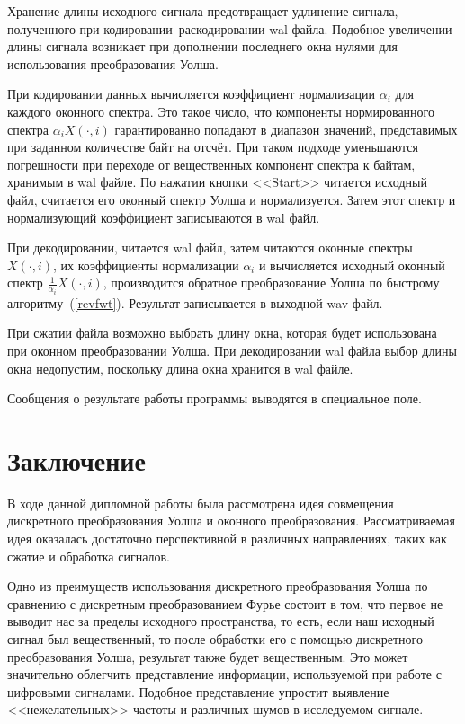 \documentclass{matmex-diploma-custom}
\begin{document}
Хранение длины исходного сигнала предотвращает удлинение сигнала, 
полученного при кодировании--раскодировании wal файла. Подобное увеличении длины
сигнала
возникает при дополнении последнего окна нулями для использования
преобразования Уолша.

При кодировании данных вычисляется коэффициент нормализации $\alpha_i$
для каждого оконного спектра. Это такое число, что компоненты нормированного 
спектра 
$\alpha_i X(\cdot,i)$ гарантированно попадают в диапазон значений, представимых
при заданном количестве байт на отсчёт. При таком подходе уменьшаются 
погрешности при переходе от вещественных компонент спектра к 
байтам, хранимым в wal файле. По нажатии кнопки <<Start>>
читается исходный файл, считается его оконный спектр Уолша и нормализуется. 
Затем этот спектр и нормализующий коэффициент 
записываются в wal файл.
  
При декодировании, читается wal файл, затем читаются оконные спектры
$X(\cdot,i)$,
их коэффициенты нормализации $\alpha_i$ и вычисляется исходный оконный спектр
$\frac{1}{\alpha_i} X(\cdot,i)$, производится обратное 
преобразование Уолша
по быстрому алгоритму~(\ref{revfwt}). Результат записывается в 
выходной wav файл.

При сжатии файла возможно выбрать длину окна, которая будет использована
при оконном преобразовании Уолша. При декодировании wal файла выбор длины окна
недопустим, поскольку длина окна хранится в wal файле.

Сообщения о результате работы программы выводятся в специальное поле.





\section*{Заключение}
В ходе данной дипломной работы была рассмотрена идея совмещения
дискретного преобразования Уолша и оконного преобразования. Рассматриваемая 
идея оказалась достаточно перспективной в различных направлениях, таких как
сжатие и обработка сигналов. 

Одно из преимуществ использования дискретного преобразования Уолша
по сравнению с дискретным преобразованием Фурье состоит в том, что
первое не выводит нас за пределы исходного пространства, то есть, если
наш исходный сигнал был вещественный, то после обработки его с помощью
дискретного преобразования Уолша, результат также будет вещественным.
Это может значительно облегчить представление информации, используемой при
работе с цифровыми сигналами. Подобное представление упростит выявление
<<нежелательных>> частоты и различных шумов в исследуемом сигнале.
\end{document}
